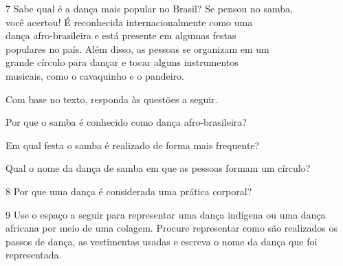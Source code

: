 \num{7} Sabe qual é a dança mais popular no Brasil? Se pensou no samba,\\ você
  acertou! É reconhecida internacionalmente como uma\\ dança
  afro-brasileira e está presente em algumas festas\\ populares no país.
  Além disso, as pessoas se organizam em um\\ grande círculo para dançar e
  tocar alguns instrumentos\\ musicais, como o cavaquinho e o pandeiro.


\noindent{}Com base no texto, responda às questões a seguir.

\endgroup

\begin{escolha}
\item Por que o samba é conhecido como dança afro-brasileira?


\item Em qual festa o samba é realizado de forma mais frequente?


\item Qual o nome da dança de samba em que as pessoas formam um círculo?

\end{escolha}


\num{8} Por que uma dança é considerada uma prática corporal?


\num{9} Use o espaço a seguir para representar uma dança indígena ou uma dança
  africana por meio de uma colagem. Procure representar como são realizados
  os passos de dança, as vestimentas usadas e escreva o nome da dança
  que foi representada.

\begin{mdframed}[linewidth=2pt,linecolor=salmao]
\vspace{6cm}
\end{mdframed}

